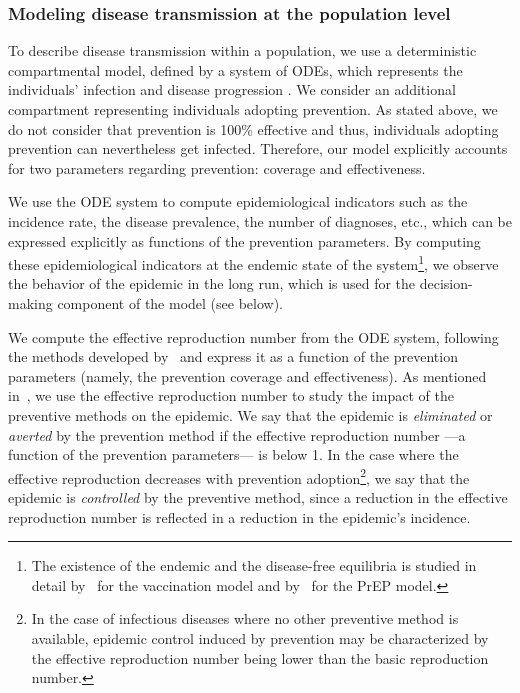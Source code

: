 \subsubsection{Modeling disease transmission at the population level}
To describe disease transmission within a population, we use a deterministic compartmental model, defined by a system of ODEs, which represents the individuals' infection and disease progression \cite[]{Hethcote2000,Jacquez1988}. We consider an additional compartment representing individuals adopting prevention. As stated above, we do not consider that prevention is 100\% effective and thus, individuals adopting prevention can nevertheless get infected. Therefore, our model explicitly accounts for two parameters regarding prevention: coverage and effectiveness.

We use the ODE system to compute epidemiological indicators such as the incidence rate, the disease prevalence, the number of diagnoses, etc., which can be expressed explicitly as functions of the prevention parameters. By computing these epidemiological indicators at the endemic state of the system\footnote{The existence of the endemic and the disease-free equilibria is studied in detail by~\citet{Hethcote2000} for the vaccination model and by~\citet{Jacquez1988} for the PrEP model.}, we observe the behavior of the epidemic in the long run, which is used for the decision-making component of the model (see below). 

We compute the effective reproduction number from the ODE system, following the methods developed by~\citet{VanDenDriessche2002} and express it as a function of the prevention parameters (namely, the prevention coverage and effectiveness). As mentioned in~, we use the effective reproduction number to study the impact of the preventive methods on the epidemic. We say that the epidemic is \textit{eliminated} or \textit{averted} by the prevention method if the effective reproduction number ---a function of the prevention parameters--- is below 1. In the case where the effective reproduction decreases with prevention adoption\footnote{In the case of infectious diseases where no other preventive method is available, epidemic control induced by prevention may be characterized by the effective reproduction number being lower than the basic reproduction number.}, we say that the epidemic is \textit{controlled} by the preventive method, since a reduction in the effective reproduction number is reflected in a reduction in the epidemic's incidence.

